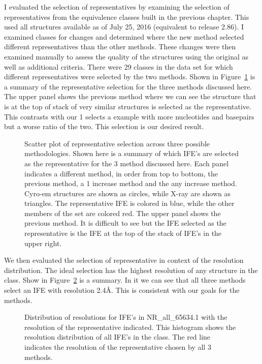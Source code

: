 I evaluated the selection of representatives by examining the selection of
representatives from the equivalence classes built in the previous chapter. This
used all structures available as of July 25, 2016 (equivalent to release 2.86).
I examined classes for changes and determined where the new method selected
different representatives than the other methods. These changes were then
examined manually to assess the quality of the structures using the original as
well as additional criteria. There were 29 classes in the data set for which
different representatives were selected by the two methods. Shown in
Figure~\ref{fig:hm-lsu-rep} is a summary of the representative selection for the
three methods discussed here. The upper panel shows the previous method where we
can see the structure that is at the top of stack of very similar structures is
selected as the representative. This contrasts with our 1%
selects a example with more nucleotides and basepairs but a worse ratio of the
two. This selection is our desired result.

\begin{figure}
  \caption{Scatter plot of representative selection across three possible
    methodologies. Shown here is a summary of which IFE’s are selected as the
    representative for the 3 method discussed here. Each panel indicates a
    different method, in order from top to bottom, the previous method, a 1%
    increase method and the any increase method. Cyro-em structures are shown as
    circles, while X-ray are shown as triangles.  The representative IFE is
    colored in blue, while the other members of the set are colored red. The
    upper panel shows the previous method. It is difficult to see but the IFE
    selected as the representative is the IFE at the top of the stack of IFE’s
  in the upper right.}
  \label{fig:hm-lsu-rep}
\end{figure}

We then evaluated the selection of representative in context of the resolution
distribution. The ideal selection has the highest resolution of any structure in
the class. Show in Figure~\ref{fig:hm-rep-res-dist} is a summary. In it we can
see that all three methods select an IFE with resolution 2.4Å. This is
consistent with our goals for the methods.

\begin{figure}
  \caption{Distribution of resolutions for IFE’s in NR\_all\_65634.1 with the
    resolution of the representative indicated. This histogram shows the
    resolution distribution of all IFE’s in the class. The red line indicates
  the resolution of the representative chosen by all 3 methods.}
  \label{fig:hm-rep-res-dist}
\end{figure}

